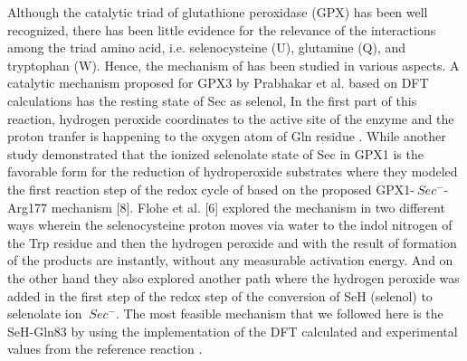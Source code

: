 \documentclass[journal=jacsat,manuscript=article]{achemso}
\begin{document}
Although the catalytic triad of glutathione peroxidase (GPX) has been well recognized, there has been little evidence for the relevance of the interactions among the triad amino acid, i.e. selenocysteine (U), glutamine (Q), and tryptophan (W). Hence, the mechanism of has been studied in various aspects. A catalytic mechanism proposed for GPX3 by Prabhakar et al. based on DFT calculations has the resting state of Sec as selenol, In the first part of this reaction, hydrogen peroxide coordinates to the active site of the enzyme and the proton tranfer is happening to the oxygen atom of Gln residue \cite{prabhakar_elucidation_2005,prabhakar_is_2006}. While another study demonstrated that the ionized selenolate state of Sec in GPX1 is the favorable form for the reduction of hydroperoxide substrates where they modeled the ﬁrst reaction step of the redox cycle of based on the proposed GPX1-\({\ Sec^-}\)- Arg177 mechanism [8]. Flohe et al. [6]\cite{orian_selenocysteine_2015} explored the mechanism in two different ways wherein the selenocysteine proton moves via water to the indol nitrogen of the Trp residue and then the hydrogen peroxide and with the result of formation of  the products are instantly, without any measurable activation energy. And on the other hand they also explored another path where the hydrogen peroxide was added in the first step of the redox step of the conversion of SeH (selenol) to selenolate ion \({\ Sec^-}\)\cite{flohe_glutathione_2022,orian_selenocysteine_2015}. The most feasible mechanism that we followed here is the SeH-Gln83 by using the implementation of the DFT calculated and experimental values from the reference reaction \cite{prabhakar_is_2006}. 
\end{document}
